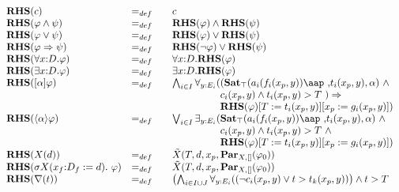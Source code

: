\documentclass{article}
\begin{document}
\begin{equation*}
\begin{array}{lll}
{\mathbf{RHS}}(c) & =_{def} & c \\
{\mathbf{RHS}}(\varphi \wedge \psi ) & =_{def} & {\mathbf{RHS}}(\varphi
)\wedge {\mathbf{RHS}}(\psi ) \\
{\mathbf{RHS}}(\varphi \vee \psi ) & =_{def} & {\mathbf{RHS}}(\varphi )\vee {%
\mathbf{RHS}}(\psi ) \\
{\mathbf{RHS}}(\varphi \Rightarrow \psi ) & =_{def} & {\mathbf{RHS}}(\lnot
\varphi )\vee {\mathbf{RHS}}(\psi ) \\
{\mathbf{RHS}}(\forall {x{:}D}.\varphi ) & =_{def} & \forall {x{:}D}.{%
\mathbf{RHS}}(\varphi ) \\
{\mathbf{RHS}}(\exists {x{:}D}.\varphi ) & =_{def} & \exists {x{:}D}.{%
\mathbf{RHS}}(\varphi ) \\
{\mathbf{RHS}}([\alpha ]\varphi ) & =_{def} & \bigwedge_{i{\in }I}\forall _{y%
{:}E_{i}}((\mathbf{Sat}_{\top }(a_{i}(f_{i}(x_{p},y))\mbox{\aap ,}%
t_{i}(x_{p},y),\alpha )\ \wedge \\
&  & \phantom{\bigwedge_{i {\in} I} \forall_{y {:} E_i}(}c_{i}(x_{p},y)%
\wedge t_{i}(x_{p},y)>T\ )\Rightarrow \\
&  & \phantom{\bigwedge_{i {\in} I} \forall_{y {:} E_i}(} {\mathbf{RHS}}%
(\varphi )[T:=t_{i}(x_{p},y)][x_{p}:=g_{i}(x_{p},y)]) \\
{\mathbf{RHS}}(\langle \alpha \rangle \varphi ) & =_{def} & \bigvee_{i{\in }%
I}\exists _{y{:}E_{i}}(\mathbf{Sat}_{\top }(a_{i}(f_{i}(x_{p},y))%
\mbox{\aap
,}t_{i}(x_{p},y),\alpha )\ \wedge \\
&  & \phantom{\bigvee_{i {\in} I} \exists_{y {:} E_i}(}c_{i}(x_{p},y)\wedge
t_{i}(x_{p},y)>T\ \wedge \\
&  & \phantom{\bigvee_{i {\in} I} \exists_{y {:} E_i}(} {\mathbf{RHS}}%
(\varphi )[T:=t_{i}(x_{p},y)][x_{p}:=g_{i}(x_{p},y)]) \\
{\mathbf{RHS}}(X(d)) & =_{def} & \tilde{X}(T,d,x_{p},\mathbf{Par}%
_{X,[]}(\varphi _{0})) \\
{\mathbf{RHS}}(\sigma X(x_{f}{:}D_{f}:=d).~\varphi ) & =_{def}~~~ & \tilde{X}%
(T,d,x_{p},\mathbf{Par}_{X,[]}(\varphi _{0})) \\
{\mathbf{RHS}}(\nabla (t)) & =_{def} & \left( \bigwedge_{i{\in }I\cup
J}\forall _{y{:}E_{i}}((\lnot c_{i}(x_{p},y)\vee t>t_{k}(x_{p},y))\right)
\wedge t>T \\

\end{array}
\end{equation*}
\end{document}
